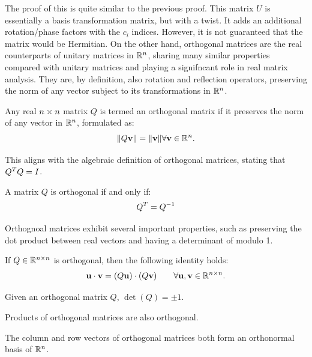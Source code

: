 \documentclass[12pt]{article}
\begin{document}
The proof of this is quite similar to the previous proof. This matrix $U$ is essentially a basis transformation matrix, but with a twist. It adds an additional rotation/phase factors with the $c_i$ indices. However, it is not guaranteed that the matrix would be Hermitian. On the other hand, orthogonal matrices are the real counterparts of unitary matrices in $\mathbb{R}^n$, sharing many similar properties compared with unitary matrices and playing a signifncant role in real matrix analysis. They are, by definition, also rotation and reflection operators, preserving the norm of any vector subject to its transformations in $\mathbb{R}^n$. 

\begin{definition}
    Any real ${n \times n}$ matrix $Q$ is termed an orthogonal matrix if it preserves the norm of any vector in $\mathbb{R}^n$, formulated as:
    \[
    \norm{Q \mathbf{v}} = \norm{\mathbf{v}} \forall \mathbf{v} \in \mathbb{R}^n.
    \] 
\end{definition}

This aligns with the algebraic definition of orthogonal matrices, stating that ${Q}^{T} Q = I$. 

\begin{theorem}
    A matrix $Q$ is orthogonal if and only if:
    \[
    {Q}^{T} = {Q}^{-1}
    \]
\end{theorem}

Orthognoal matrices exhibit several important properties, such as preserving the dot product between real vectors and having a determinant of modulo 1. 

\begin{theorem}
   If $Q \in \mathbb{R}^{n \times n}$ is orthogonal, then the following identity holds:
   \[
    \mathbf{u} \cdot \mathbf{v} = (Q \mathbf{u}) \cdot (Q \mathbf{v}) \qquad \forall \mathbf{u}, \mathbf{v} \in \mathbb{R}^{n \times n}.
   \] 
\end{theorem}

\begin{theorem}
    Given an orthogonal matrix $Q$, $\det(Q) = \pm 1$.
\end{theorem}

\begin{theorem}
    Products of orthogonal matrices are also orthogonal. 
\end{theorem}

\begin{theorem}
    The column and row vectors of orthogonal matrices both form an orthonormal basis of $\mathbb{R}^n$. 
\end{theorem}
\end{document}
